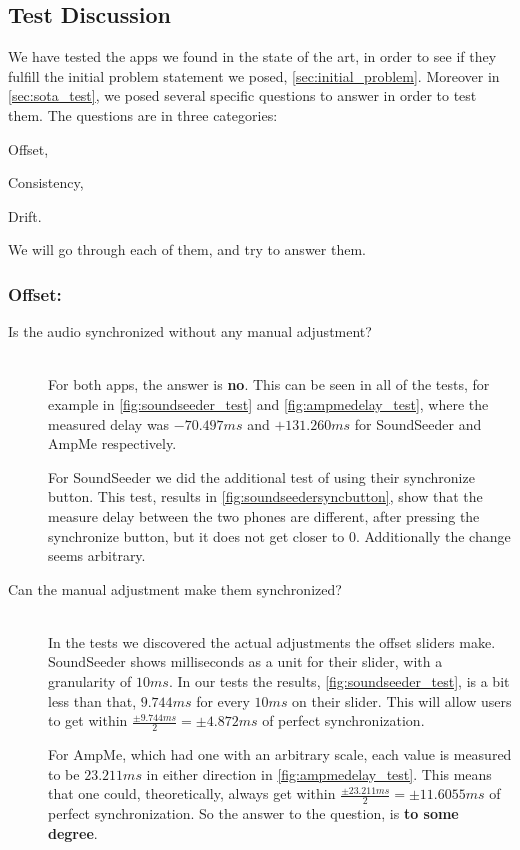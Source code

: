 \subsection{Test Discussion}

We have tested the apps we found in the state of the art, in order to see if they fulfill the initial problem statement we posed, \vref{sec:initial_problem}.
Moreover in \vref{sec:sota_test}, we posed several specific questions to answer in order to test them. 
The questions are in three categories: 
\begin{enumerate*}[label=(\alph*)]
    \item Offset,
    \item Consistency,
    \item Drift.
\end{enumerate*}
We will go through each of them, and try to answer them.

\subsubsection*{Offset:}
\begin{description}
    \item[Is the audio synchronized without any manual adjustment?] \hfill \\
    For both apps, the answer is \textbf{no}. 
    This can be seen in all of the tests, for example in \vref{fig:soundseeder_test} and \vref{fig:ampmedelay_test}, where the measured delay was $-70.497 ms$ and $+131.260 ms$ for SoundSeeder and AmpMe respectively.
    
    For SoundSeeder we did the additional test of using their synchronize button. 
    This test, results in \vref{fig:soundseedersyncbutton}, show that the measure delay between the two phones are different, after pressing the synchronize button, but it does not get closer to $0$. 
    Additionally the change seems arbitrary.  
    \item[Can the manual adjustment make them synchronized?] \hfill \\
    In the tests we discovered the actual adjustments the offset sliders make. 
    SoundSeeder shows milliseconds as a unit for their slider, with a granularity of $10 ms$.
    In our tests the results, \vref{fig:soundseeder_test}, is a bit less than that, $9.744 ms$ for every $10 ms$ on their slider.
    This will allow users to get within $\frac{\pm9.744 ms}{2}=\pm 4.872 ms$ of perfect synchronization.
    
    For AmpMe, which had one with an arbitrary scale, each value is measured to be $23.211 ms$ in either direction in \vref{fig:ampmedelay_test}.
    This means that one could, theoretically, always get within $\frac{\pm23.211 ms}{2}=\pm 11.6055 ms$ of perfect synchronization. 
    So the answer to the question, is \textbf{to some degree}.
\end{description}

